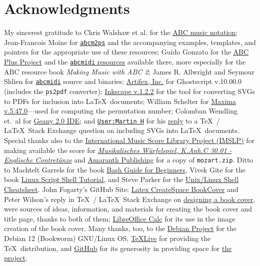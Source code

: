 \documentclass[letterpaper,x11names,svgnames,10pt]{article}
\begin{document}
\section{Acknowledgments}
My sincerest gratitude to Chris Walshaw et al. for the \href{http://www.abcnotation.com/}{ABC music notation}; Jean-Francois Moine for \href{http://moinejf.free.fr/}{\tt abcm2ps} and the accompanying examples, templates, and pointers for the appropriate use of these resources; Guido Gonzato for the \href{http://abcplus.sourceforge.net/}{ABC Plus Project} and the \href{http://abcplus.sourceforge.net/#abcMIDI}{{\tt abcmidi} resources} available there, more especially for the ABC resource book {\em Making Music with ABC 2}; James R. Allwright and Seymour Shlien for \href{http://abc.sourceforge.net/abcMIDI}{\tt abcmidi} source and binaries; \href{https://artifex.com/}{Artifex, Inc.} for Ghostscript v.10.00.0 (includes the {\tt ps2pdf} converter); \href{https://www.inkscape.org/}{Inkscape v.1.2.2} for the tool for converting SVGs to PDFs for inclusion into \LaTeX\ documents; William Schelter for \href{https://maxima.sourceforge.io}{Maxima v.5.47.0}---used for computing the permutation number; Colomban Wendling et.\ al for \href{https://www.geany.org}{Geany 2.0 IDE}; and \href{https://tex.stackexchange.com/users/632/martin-h}{\tt User:Martin H} for his \href{https://tex.stackexchange.com/questions/2099/how-to-include-svg-diagrams-in-latex}{reply} to a \TeX\ / \LaTeX\ Stack Exchange question on including SVGs into \LaTeX\ documents. Special thanks also to the \href{http://imslp.org/}{International Music Score Library Project (IMSLP)} for making available the score for \href{https://imslp.org/wiki/Musikalische_W\%C3\%BCrfelspiele\%2C_K.Anh.C.30.01_(Mozart\%2C_Wolfgang_Amadeus)}{\em Musikalisches W\"{u}rfelspiel, K.Anh.C 30.01 - Englische Contret\"{a}nze} and \href{http://www.amaranthpublishing.com/MozartDiceGame.htm}{Amaranth Publishing} for a copy of {\tt mozart.zip}. Ditto to Machtelt Garrels for the book \href{http://tldp.org/LDP/Bash-Beginners-Guide/html/Bash-Beginners-Guide.html}{Bash Guide for Beginners}, Vivek Gite for the book \href{http://www.freeos.com/guides/lsst/}{Linux Script Shell Tutorial}, and Steve Parker for the \href{http://steve-parker.org/sh/cheatsheet.pdf}{Unix/Linux Shell Cheatsheet}. John Fogarty's GitHub Site: \href{https://github.com/jfogarty/latex-createspace-bookcover}{Latex CreateSpace BookCover} and Peter Wilson's reply in \TeX\ / \LaTeX\ Stack Exchange on \href{https://tex.stackexchange.com/questions/17579/how-can-i-design-a-book-cover}{designing a book cover}, were sources of ideas, information, and materials for creating the book cover and title page, thanks to both of them; \href{http://www.libreoffice.org/}{LibreOffice Calc} for its use in the image creation of the book cover.  Many thanks, too, to the \href{https://www.debian.org}{Debian Project} for the Debian 12 (Bookworm) GNU/Linux OS, \href{http://www.tug.org/texlive/}{TeXLive} for providing the \TeX\ distribution,  and \href{https://github.com}{GitHub} for its generosity in providing space for \href{https://github.com/justineuro/mdgBookSVGecdKit}{the project}.  
\end{document}
